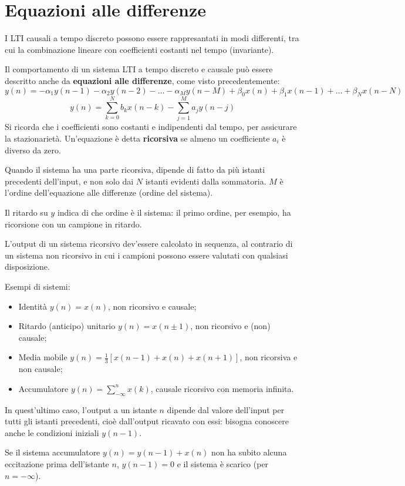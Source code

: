 \section{Equazioni alle differenze}
I LTI causali a tempo discreto possono essere rappresantati in modi differenti, tra cui la combinazione lineare con coefficienti costanti nel tempo (invariante). 

Il comportamento di un sistema LTI a tempo discreto e causale può essere descritto anche da \textbf{equazioni alle differenze}, come visto precedentemente:
$$y(n) = -\alpha_1y(n-1) - \alpha_2y(n - 2) - \ldots - \alpha_My(n - M) + \beta_0x(n) + \beta_1x(n - 1) + \ldots + \beta_Nx(n - N)$$
$$y(n) = \sum_{k=0}^{N} b_kx(n - k) - \sum_{j=1}^{M} a_jy(n - j)$$
Si ricorda che i coefficienti sono costanti e indipendenti dal tempo, per assicurare la stazionarietà. Un'equazione è detta \textbf{ricorsiva} se almeno un coefficiente $a_i$ è diverso da zero.

Quando il sistema ha una parte ricorsiva, dipende di fatto da più istanti precedenti dell'input, e non solo dai $N$ istanti evidenti dalla sommatoria. $M$ è l'ordine dell'equazione alle differenze (ordine del sistema).

Il ritardo su $y$ indica di che ordine è il sistema: il primo ordine, per esempio, ha ricorsione con un campione in ritardo. 

L'output di un sistema ricorsivo dev'essere calcolato in sequenza, al contrario di un sistema non ricorsivo in cui i campioni possono essere valutati con qualsiasi disposizione.

Esempi di sistemi:
\begin{itemize}
	\item Identità $y(n) = x(n)$, non ricorsivo e causale;
	\item Ritardo (anticipo) unitario $y(n) = x(n \pm 1)$, non ricorsivo e (non) causale;
	\item Media mobile $y(n) = \frac{1}{3} [x(n - 1) + x(n) + x(n + 1)]$, non ricorsiva e non causale;
	\item Accumulatore $y(n) = \sum_{-\infty}^{n} x(k)$, causale ricorsivo con memoria infinita.
\end{itemize}
In quest'ultimo caso, l'output a un istante $n$ dipende dal valore dell'input per tutti gli istanti precedenti, cioè dall'output ricavato con essi: bisogna conoscere anche le condizioni iniziali $y(n - 1)$.

Se il sistema accumulatore $y(n) = y(n - 1) + x(n)$ non ha subito alcuna eccitazione prima dell'istante $n$, $y(n - 1) = 0$ e il sistema è scarico (per $n = -\infty$).

